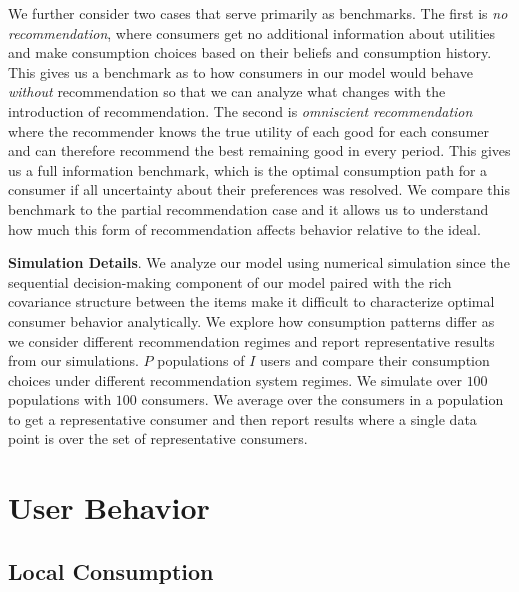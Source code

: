 \documentclass[sigconf]{acmart}
\begin{document}
We further consider two cases that serve primarily as benchmarks. The first is \textit{no recommendation}, where consumers get no additional information about utilities and make consumption choices based on their beliefs and consumption history. This gives us a benchmark as to how consumers in our model would behave \textit{without} recommendation so that we can analyze what changes with the introduction of recommendation. The second is \textit{omniscient recommendation} where the recommender knows the true utility of each good for each consumer and can therefore recommend the best remaining good in every period. This gives us a full information benchmark, which is the optimal consumption path for a consumer if all uncertainty about their preferences was resolved. We compare this benchmark to the partial recommendation case and it allows us to understand how much this form of recommendation affects behavior relative to the ideal.
\par
\noindent \textbf{Simulation Details}. We analyze our model using numerical simulation since the sequential decision-making component of our model paired with the rich covariance structure between the items make it difficult to characterize optimal consumer behavior analytically. We explore how consumption patterns differ as we consider different recommendation regimes and report representative results from our simulations. $P$ populations of $I$ users and compare their consumption choices under different recommendation system regimes. We simulate over $100$ populations with $100$ consumers. We average over the consumers in a population to get a representative consumer and then report results where a single data point is over the set of representative consumers.

\section{User Behavior}

\subsection{Local Consumption}
\end{document}
